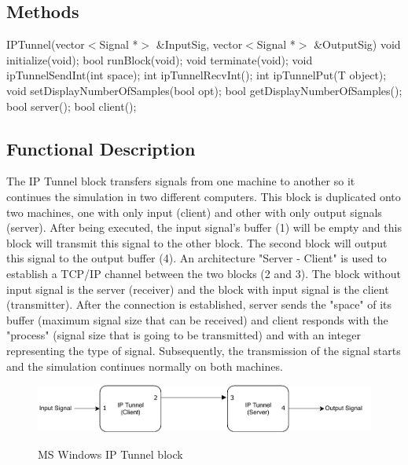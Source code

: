 %

\subsection*{Methods}
%
IPTunnel(vector$<$Signal *$>$ \&InputSig, vector$<$Signal *$>$ \&OutputSig)
\bigbreak
void initialize(void);
\bigbreak
bool runBlock(void);
\bigbreak
void terminate(void);
\bigbreak
void ipTunnelSendInt(int space);
\bigbreak
int ipTunnelRecvInt();
\bigbreak
int ipTunnelPut(T object);
\bigbreak
void setDisplayNumberOfSamples(bool opt);
\bigbreak
bool getDisplayNumberOfSamples();
\bigbreak
bool server();
\bigbreak
bool client();



\subsection*{Functional Description}

The IP Tunnel block transfers signals from one machine to another so it continues the simulation in two different computers. This block is duplicated onto two machines, one with only input (client) and other with only output signals (server). After being executed, the input signal's buffer (1) will be empty and this block will transmit this signal to the other block. The second block will output this signal to the output buffer (4). An architecture "Server - Client" is used to establish a TCP/IP channel between the two blocks (2 and 3). The block without input signal is the server (receiver) and the block with input signal is the client (transmitter). After the connection is established, server sends the "space" of its buffer (maximum signal size that can be received) and client responds with the "process" (signal size that is going to be transmitted) and with an integer representing the type of signal. Subsequently, the transmission of the signal starts and the simulation continues normally on both machines.

\begin{figure}[h]
	\centering
	\includegraphics[width=1.0\textwidth]{./lib/ms_windows_ip_tunnel/figures/StructureTCPIP4.pdf}
	\label{IP Tunnel Block}\caption{MS Windows IP Tunnel block}
\end{figure}